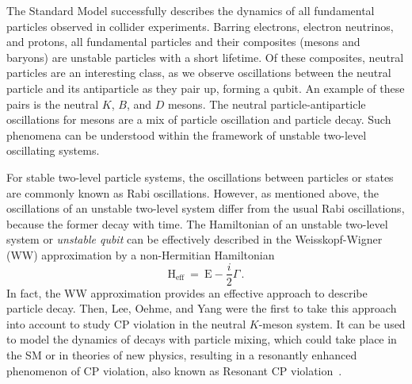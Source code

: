 \documentclass[12pt,a4paper]{article}
\begin{document}
The Standard Model successfully describes the dynamics of all fundamental particles observed in collider experiments. Barring electrons, electron neutrinos, and protons, all fundamental particles and their composites (mesons and baryons) are unstable particles with a short lifetime. Of these composites, neutral particles are an interesting class, as we observe oscillations between the neutral particle and its antiparticle as they pair up, forming a qubit. An example of these pairs is the neutral $K$, $B$, and $D$ mesons\cite{ParticleDataGroup:2024cfk}. The neutral particle-antiparticle oscillations for mesons are a mix of particle oscillation and particle decay. Such phenomena can be understood within the framework of unstable two-level oscillating systems.

For stable two-level particle systems, the oscillations between particles or states are commonly known as Rabi oscillations\cite{Rabi:1937dgo}. However, as mentioned above, the oscillations of an unstable two-level system differ from the usual Rabi oscillations, because the former decay with time. The Hamiltonian of an unstable two-level system or {\em unstable qubit} can be effectively described in the Weisskopf-Wigner (WW) approximation\cite{Weisskopf1930} by a non-Hermitian Hamiltonian
\begin{equation}
   \label{non_hermitian Hamiltonian}
    \mathrm{H}_{\text{eff}}\: =\: \mathrm{E}-\dfrac{i}{2}\Gamma\, .
\end{equation}
In fact, the WW approximation provides an effective approach to describe particle decay. Then, Lee, Oehme, and Yang\cite{Lee:1957qq} were the first to take this approach into account to study CP violation in the neutral $K$-meson system. It can be used to model the dynamics of decays with  particle mixing, which could take place in the SM or in theories of new physics, resulting in a resonantly enhanced phenomenon of CP violation, also known as Resonant CP violation~\cite{Pilaftsis:1997dr}.
\end{document}

